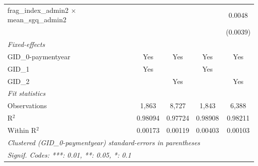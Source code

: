 \begin{table}[!htbp]
\begin{tabular}{lcccc}
   frag\_index\_admin2 $\times$ mean\_sgq\_admin2      &              &                &          & 0.0048\\   
                                                       &              &                &          & (0.0039)\\   
   \midrule
   \emph{Fixed-effects}\\
   GID\_0-paymentyear                                  & Yes          & Yes            & Yes      & Yes\\  
   GID\_1                                              & Yes          &                & Yes      & \\  
   GID\_2                                              &              & Yes            &          & Yes\\  
   \midrule
   \emph{Fit statistics}\\
   Observations                                        & 1,863        & 8,727          & 1,843    & 6,388\\  
   R$^2$                                               & 0.98094      & 0.97724        & 0.98908  & 0.98211\\  
   Within R$^2$                                        & 0.00173      & 0.00119        & 0.00403  & 0.00103\\  
   \midrule \midrule
   \multicolumn{5}{l}{\emph{Clustered (GID\_0-paymentyear) standard-errors in parentheses}}\\
   \multicolumn{5}{l}{\emph{Signif. Codes: ***: 0.01, **: 0.05, *: 0.1}}\\
\end{tabular}
\end{table}
\par\endgroup



